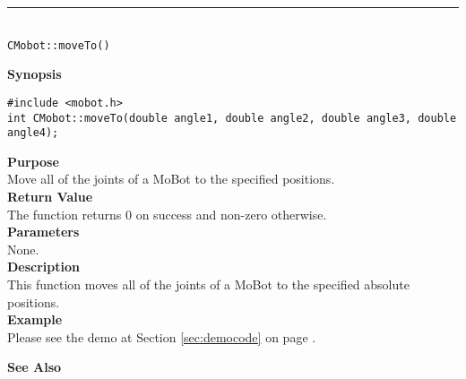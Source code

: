 \noindent
\vspace{5pt}
\rule{4.5in}{0.015in}\\
\noindent
{\LARGE \texttt{CMobot::moveTo()}}\\
{}

\noindent
{\bf Synopsis}\\
\begin{verbatim}
#include <mobot.h>
int CMobot::moveTo(double angle1, double angle2, double angle3, double angle4);
\end{verbatim}

\noindent
{\bf Purpose}\\
Move all of the joints of a MoBot to the specified positions.\\

\noindent
{\bf Return Value}\\
The function returns 0 on success and non-zero otherwise.\\

\noindent
{\bf Parameters}\\
None.\\

\noindent
{\bf Description}\\
This function moves all of the joints of a MoBot to the specified absolute positions. \\

\noindent
{\bf Example}\\
Please see the demo at Section \ref{sec:democode} on page \pageref{sec:democode}.\\
\noindent

\noindent
{\bf See Also}\\

